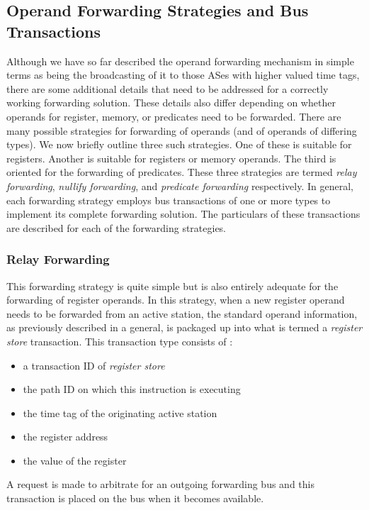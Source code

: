 \documentclass[10pt,dvips]{article}
\begin{document}
\subsection{Operand Forwarding Strategies and Bus Transactions}
%
Although we have so far described the operand forwarding mechanism
in simple terms as being the broadcasting of it 
to those ASes with higher valued 
time tags, there are some additional details that need to be
addressed for a correctly working forwarding solution.
These details also differ depending on whether operands for
register, memory, or predicates need to be forwarded.
There are many possible strategies for forwarding of operands
(and of operands of differing types). 
We now briefly outline three such strategies.
One of these is suitable for registers.
Another is suitable for registers or memory operands.
The third is oriented for the forwarding of predicates.
These three strategies are termed \textit{relay forwarding},
\textit{nullify forwarding}, and \textit{predicate forwarding}
respectively.
In general, each forwarding strategy employs bus transactions
of one or more types to implement its complete forwarding solution.
The particulars of these transactions are described for each
of the forwarding strategies.
%
%
\subsubsection{Relay Forwarding}
%
This forwarding strategy is quite simple but is also entirely
adequate for the forwarding of register operands.
In this strategy, when a new register operand needs to be forwarded
from an active station, the standard operand information, as 
previously described
in a general, is packaged up into what is termed
a \textit{register store} transaction.
This transaction type consists of :
%
\begin{itemize}
\vspace{-0.05in}
\item{a transaction ID of \textit{register store}}
\vspace{-0.05in}
\item{the path ID on which this instruction is executing}
\vspace{-0.05in}
\item{the time tag of the originating active station}
\vspace{-0.05in}
\item{the register address}
\vspace{-0.05in}
\item{the value of the register}
\vspace{-0.05in}
\end{itemize}   
%
A request is made to arbitrate for an outgoing forwarding bus
and this transaction is placed on the bus when it becomes available.
\end{document}
